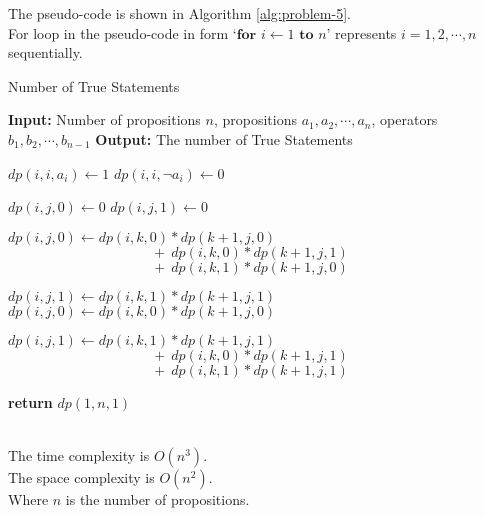 The pseudo-code is shown in Algorithm \ref{alg:problem-5}.\\
For loop in the pseudo-code in form `$\textbf{for } i \gets 1 \textbf{ to } n$' represents $i=1,2,\cdots,n$ sequentially.
\begin{algorithm}
    \caption{Number of True Statements}
    \begin{algorithmic}[1]
    \State \textbf{Input:} Number of propositions $n$, propositions $a_1,a_2,\cdots,a_n$, operators $b_1,b_2,\cdots,b_{n-1}$
    \State \textbf{Output:} The number of True Statements

        \State $dp(i,i,a_i) \gets 1$
        \State $dp(i,i,\neg a_i) \gets 0$
    \EndFor
    
            \State $dp(i,j,0) \gets 0$
            \State $dp(i,j,1) \gets 0$

                    \State $dp(i,j,0) \gets dp(i,k,0) * dp(k+1,j,0)$
                    \Statex $\quad\quad\quad\quad\quad\quad\quad\quad\quad\quad\  +\ dp(i,k,0) * dp(k+1,j,1)$
                    \Statex $\quad\quad\quad\quad\quad\quad\quad\quad\quad\quad\  +\ dp(i,k,1) * dp(k+1,j,0)$
                    
                    \State $dp(i,j,1) \gets dp(i,k,1)*dp(k+1,j,1)$
                \Else
                    \State $dp(i,j,0) \gets dp(i,k,0) * dp(k+1,j,0)$
                    
                    \State $dp(i,j,1) \gets dp(i,k,1)*dp(k+1,j,1)$
                    \Statex $\quad\quad\quad\quad\quad\quad\quad\quad\quad\quad\  +\ dp(i,k,0) * dp(k+1,j,1)$
                    \Statex $\quad\quad\quad\quad\quad\quad\quad\quad\quad\quad\  +\ dp(i,k,1) * dp(k+1,j,1)$
                    
                    \EndIf
            \EndFor
        \EndFor
    \EndFor

    \State \textbf{return} $dp(1,n,1)$
    \end{algorithmic}
    \label{alg:problem-5}
\end{algorithm}\\
The time complexity is $O(n^3)$.\\
The space complexity is $O(n^2)$.\\
Where $n$ is the number of propositions.\\

\newpage
